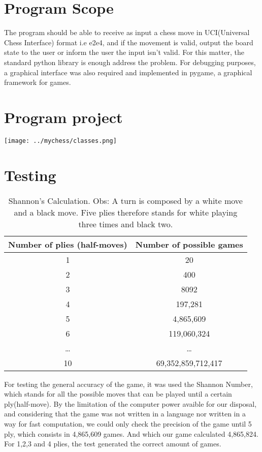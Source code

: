 \documentclass[10pt]{article}
\author{}
\title{}
\date{}
\begin{document}
\maketitle

\section{Program Scope}

The program should be able to receive as input a chess move in UCI(Universal
Chess Interface) format i.e
e2e4, and if the movement is valid, output the board state to the user or inform
the user the input isn't valid. For this matter, the standard python library is
enough address the problem. For debugging purposes, a graphical interface was
also required and implemented in pygame, a graphical framework for games.


\section{Program project}

\texttt{[image: ../mychess/classes.png]}


\section{Testing}

\begin{table}[h]
\center
\begin{tabular}{|c|c|}
\hline
\textbf{Number of plies (half-moves)}  & \textbf{Number of possible games}  \\
\hline
  1   & 20 \\
\hline
   2  &  400 \\
\hline
  3   & 8092 \\
\hline
4  & 197,281 \\
\hline
5   & 4,865,609 \\
\hline
6   & 119,060,324 \\
\hline
\ldots & \ldots \\
\hline
10 & 69,352,859,712,417 \\
\hline
\end{tabular}
\caption{Shannon's Calculation. Obs: A turn is composed by a white move and a black move. Five plies
therefore stands for white playing three times and black two.}
\end{table}

For testing the general accuracy of the game, it was used the Shannon Number,
which stands for all the possible moves that can be played until a certain
ply(half-move). By the limitation of the computer power avaible for our
disposal, and considering that the game was not written in a language nor
written in a way for fast computation, we could only check the precision of the game until 5 ply, which consists in 4,865,609 games. And which our game
calculated 4,865,824. For 1,2,3 and 4 plies, the test generated the correct
amount of games.
\end{document}
